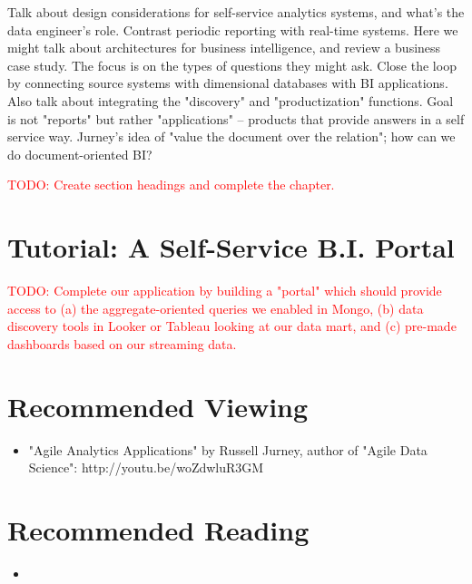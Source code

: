 \documentclass[11pt]{book}
\newcommand{\todo}[1]{\textcolor{red}{TODO: #1}} %
\begin{document}
Talk about design considerations for self-service analytics systems, and what's the data engineer's role.  Contrast periodic reporting with real-time systems.  Here we might talk about architectures for business intelligence, and review a business case study.  The focus is on the types of questions they might ask.  Close the loop by connecting source systems with dimensional databases with BI applications.  Also talk about integrating the "discovery" and "productization" functions.  Goal is not "reports" but rather "applications" -- products that provide answers in a self service way.  Jurney's idea of "value the document over the relation"; how can we do document-oriented BI?

\todo{Create section headings and complete the chapter.}

\section*{Tutorial: A Self-Service B.I. Portal}

\todo{Complete our application by building a "portal" which should provide access to (a) the aggregate-oriented queries we enabled in Mongo, (b) data discovery tools in Looker or Tableau looking at our data mart, and (c) pre-made dashboards based on our streaming data.}

\section*{Recommended Viewing}
\begin{itemize}
    \item "Agile Analytics Applications" by Russell Jurney, author of "Agile Data Science": http://youtu.be/woZdwluR3GM
\end{itemize}

\section*{Recommended Reading}
\begin{itemize}
    \item 
\end{itemize}











\end{document}
